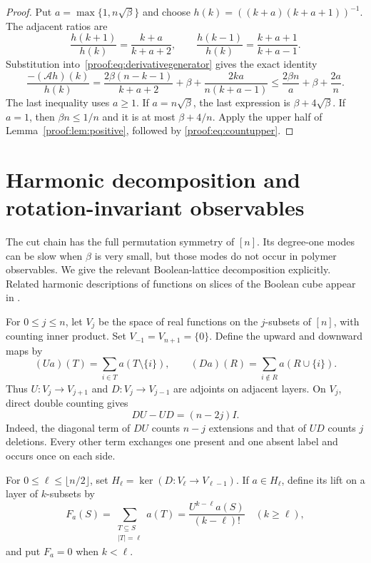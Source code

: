 \begin{proof}
Put $a=\max\{1,n\sqrt\beta\}$ and choose
$h(k)=((k+a)(k+a+1))^{-1}$. The adjacent ratios are
\[
 \frac{h(k+1)}{h(k)}=\frac{k+a}{k+a+2},\qquad
 \frac{h(k-1)}{h(k)}=\frac{k+a+1}{k+a-1}.
\]
Substitution into~\eqref{proof:eq:derivativegenerator} gives the exact
identity
\begin{equation}\label{proof:eq:uppercertificate}
 \frac{-(\mathcal Ah)(k)}{h(k)}
 =\frac{2\beta(n-k-1)}{k+a+2}+\beta
   +\frac{2ka}{n(k+a-1)}
 \leq\frac{2\beta n}{a}+\beta+\frac{2a}{n}.
\end{equation}
The last inequality uses $a\geq1$. If $a=n\sqrt\beta$, the last
expression is $\beta+4\sqrt\beta$. If $a=1$, then $\beta n\leq1/n$
and it is at most $\beta+4/n$. Apply the upper half of
Lemma~\ref{proof:lem:positive}, followed by
\eqref{proof:eq:countupper}.
\end{proof}

\section{Harmonic decomposition and rotation-invariant observables}
\label{proof:sec:harmonics}

The cut chain has the full permutation symmetry of $[n]$. Its
degree-one modes can be slow when $\beta$ is very small, but those
modes do not occur in polymer observables. We give the relevant
Boolean-lattice decomposition explicitly. Related harmonic
descriptions of functions on slices of the Boolean cube appear in
\cite{Filmus2016}.

For $0\leq j\leq n$, let $V_j$ be the space of real functions on the
$j$-subsets of $[n]$, with counting inner product. Set
$V_{-1}=V_{n+1}=\{0\}$. Define the upward and downward maps by
\[
 (Ua)(T)=\sum_{i\in T}a(T\setminus\{i\}),\qquad
 (Da)(R)=\sum_{i\notin R}a(R\cup\{i\}).
\]
Thus $U:V_j\to V_{j+1}$ and $D:V_j\to V_{j-1}$ are adjoints on
adjacent layers. On $V_j$, direct double counting gives
\begin{equation}\label{proof:eq:commutator}
 DU-UD=(n-2j)I.
\end{equation}
Indeed, the diagonal term of $DU$ counts $n-j$ extensions and that
of $UD$ counts $j$ deletions. Every other term exchanges one present
and one absent label and occurs once on each side.

For $0\leq\ell\leq\lfloor n/2\rfloor$, set
$H_\ell=\ker(D:V_\ell\to V_{\ell-1})$. If $a\in H_\ell$, define its
lift on a layer of $k$-subsets by
\begin{equation}\label{proof:eq:harmoniclift}
 F_a(S)=\sum_{\substack{T\subseteq S\\|T|=\ell}}a(T)
       =\frac{U^{k-\ell}a(S)}{(k-\ell)!}
       \quad(k\geq\ell),
\end{equation}
and put $F_a=0$ when $k<\ell$.


